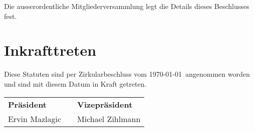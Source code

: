 \documentclass[a4paper,
               10pt,
               fleqn]{article}
\begin{document}
Die ausserordentliche Mitgliederversammlung legt die Details
dieses Beschlusses fest.

\section{Inkrafttreten}
Diese Statuten sind per Zirkularbeschluss vom
\today~angenommen worden und sind mit diesem Datum in Kraft
getreten.\newline\newline


\begin{tabular}{l r l}
\indent \textbf{Präsident} & 
    \indent \indent \indent \indent \indent \indent &
        \textbf{Vizepräsident} \\
\indent Ervin Mazlagic     & 
    \indent \indent \indent \indent \indent \indent &
        Michael Zihlmann \\
\end{tabular}


\end{document}

